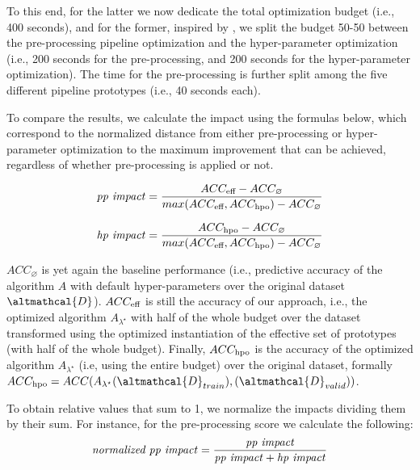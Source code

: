 To this end, for the latter we now dedicate the total optimization budget (i.e., 400 seconds), and for the former, inspired by \cite{Quemy20InfSystems}, we split the budget 50-50 between the pre-processing pipeline optimization and the hyper-parameter optimization (i.e., 200 seconds for the pre-processing, and 200 seconds for the hyper-parameter optimization).
The time for the pre-processing is further split among the five different pipeline prototypes (i.e., 40 seconds each).

To compare the results, we calculate the impact using the formulas below, which correspond to the normalized distance from either pre-processing or hyper-parameter optimization to the maximum improvement that can be achieved, regardless of whether pre-processing is applied or not.

\begin{equation*}
    \text{\textit{pp impact}} = \frac{ACC_{\textup{eff}} - ACC_{\varnothing}}{max(ACC_{\textup{eff}}, ACC_{\textup{hpo}}) - ACC_{\varnothing}}
\end{equation*}

\begin{equation*}
    \text{\textit{hp impact}} = \frac{ACC_{\textup{hpo}} - ACC_{\varnothing}}{max(ACC_{\textup{eff}}, ACC_{\textup{hpo}}) - ACC_{\varnothing}}
\end{equation*}

$ACC_{\varnothing}$ is yet again the baseline performance (i.e., predictive accuracy of the algorithm $A$ with default hyper-parameters over the original dataset $\altmathcal{D}$).
$ACC_{\textup{eff}}$ is still the accuracy of our approach, i.e., the optimized algorithm $A_{{\lambda}^{\star}}$ with half of the whole budget over the dataset transformed using the optimized instantiation of the effective set of prototypes (with half of the whole budget).
Finally, $ACC_{\textup{hpo}}$ is the accuracy of the optimized algorithm $A_{{\lambda}^{\star}}$ (i.e, using the entire budget) over the original dataset, formally $ACC_{\textup{hpo}} = ACC(A_{{\lambda}^{\star}}(\altmathcal{D}_{train}), (\altmathcal{D}_{valid}))$.

To obtain relative values that sum to 1, we normalize the impacts dividing them by their sum.
For instance, for the pre-processing score we calculate the following:
\begin{equation*}
    \text{\textit{normalized pp impact}} = \frac{\text{\textit{pp impact}}}
    {\text{\textit{pp impact}} + \text{\textit{hp impact}}}
\end{equation*}


